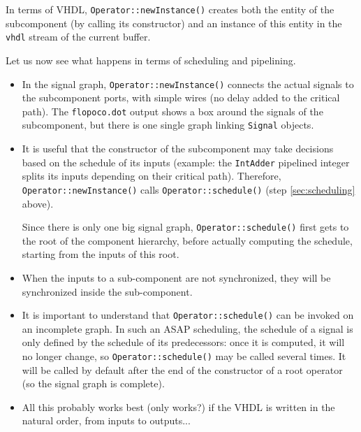 \documentclass{article}
\begin{document}
In terms of VHDL, \verb!Operator::newInstance()! creates both the entity of the subcomponent (by calling its constructor) and an instance of this entity in the \texttt{vhdl} stream of the current buffer.

Let us now see what happens in terms of scheduling and pipelining.
\begin{itemize}
\item In the signal graph, \verb!Operator::newInstance()! connects the actual signals to the subcomponent ports, with simple wires (no delay added to the critical path).
  The \texttt{flopoco.dot} output shows a box around the signals of the subcomponent, but there is one single graph linking \texttt{Signal} objects.

\item It is useful that the constructor of the subcomponent may take decisions based on the schedule of its inputs (example: the \texttt{IntAdder} pipelined integer splits its inputs depending on their critical path).
  Therefore, \verb!Operator::newInstance()! calls \verb!Operator::schedule()! (step \ref{sec:scheduling} above).

  Since there is only one big signal graph, \verb!Operator::schedule()! first gets to the root of the component hierarchy, before actually computing the schedule, starting from the inputs of this root.

\item When the inputs to a sub-component are not synchronized, they will be synchronized inside the sub-component.

\item It is important to understand that \verb!Operator::schedule()! can be invoked on an incomplete graph.
  In such an ASAP scheduling, the schedule of a signal is only defined by the schedule of its predecessors: once it is computed, it will no longer change, so \verb!Operator::schedule()! may be called several times. It will be called by default after the end of the constructor of a root operator (so the signal graph is complete).

\item All this probably works best (only works?) if the VHDL is written in the natural order, from inputs to outputs... 

\end{itemize}
\end{document}
